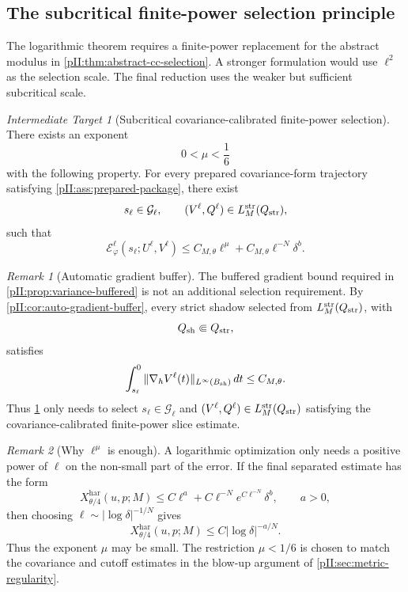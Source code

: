 \documentclass[11pt]{article}
\numberwithin{equation}{section}
\theoremstyle{plain}
\theoremstyle{definition}
\theoremstyle{remark}
\newtheorem{target}{Intermediate Target}[section]
\newtheorem{remark}{Remark}[section]
\newcommand{\har}{\mathrm{har}}
\newcommand{\str}{\mathrm{str}}
\newcommand{\dt}{\,dt}
\begin{document}
\subsection{The subcritical finite-power selection principle}\label{pII:sec:subcritical-principle}

The logarithmic theorem requires a finite-power replacement for the abstract modulus in \cref{pII:thm:abstract-cc-selection}.  A stronger formulation would use $\ell^2$ as the selection scale.  The final reduction uses the weaker but sufficient subcritical scale.

\begin{target}[Subcritical covariance-calibrated finite-power selection]\label{pII:ass:subcritical-selection}
There exists an exponent
\begin{equation}\label{pII:eq:mu-range}
        0<\mu<\frac16
\end{equation}
with the following property.  For every prepared covariance-form trajectory satisfying \cref{pII:ass:prepared-package}, there exist
\[
        s_\ell\in\mathcal G_\ell,
        \qquad
        (V^\ell,Q^\ell)\in L_M^{\str}(Q_{\rm str}),
\]
such that
\begin{equation}\label{pII:eq:subcritical-selection}
        \mathcal E_\varphi^\ell(s_\ell;U^\ell,V^\ell)
        \le C_{M,\theta}\ell^\mu
        +C_{M,\theta}\ell^{-N}\delta^b.
\end{equation}
\end{target}

\begin{remark}[Automatic gradient buffer]
The buffered gradient bound required in \cref{pII:prop:variance-buffered} is not an additional selection requirement.  By \cref{pII:cor:auto-gradient-buffer}, every strict shadow selected from $L_M^{\str}(Q_{\rm str})$, with
\[
        Q_{\rm sh}\Subset Q_{\rm str},
\]
satisfies
\[
        \int_{s_\ell}^0
        \|\nabla_hV^\ell(t)\|_{L^\infty(B_{\rm sh})}\dt
        \le C_{M,\theta}.
\]
Thus \cref{pII:ass:subcritical-selection} only needs to select $s_\ell\in\mathcal G_\ell$ and $(V^\ell,Q^\ell)\in L_M^{\str}(Q_{\rm str})$ satisfying the covariance-calibrated finite-power slice estimate.
\end{remark}

\begin{remark}[Why $\ell^\mu$ is enough]
A logarithmic optimization only needs a positive power of $\ell$ on the non-small part of the error.  If the final separated estimate has the form
\[
        X_{\theta/4}^{\har}(u,p;M)
        \le C\ell^a+C\ell^{-N}e^{C\ell^{-N}}\delta^b,
        \qquad a>0,
\]
then choosing $\ell\sim |\log\delta|^{-1/N}$ gives
\[
        X_{\theta/4}^{\har}(u,p;M)
        \le C|\log\delta|^{-a/N}.
\]
Thus the exponent $\mu$ may be small.  The restriction $\mu<1/6$ is chosen to match the covariance and cutoff estimates in the blow-up argument of \cref{pII:sec:metric-regularity}.
\end{remark}
\end{document}
